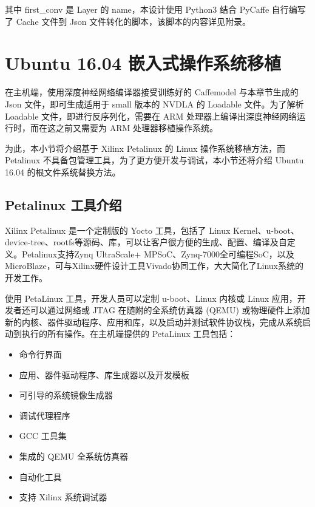 其中 first\_conv 是 Layer 的 name，本设计使用 Python3 结合 PyCaffe 自行编写了 Cache 文件到 Json 文件转化的脚本，该脚本的内容详见附录。

 
\section{Ubuntu 16.04 嵌入式操作系统移植}

在主机端，使用深度神经网络编译器接受训练好的 Caffemodel 与本章节生成的 Json 文件，即可生成适用于 small 版本的 NVDLA 的 Loadable 文件。为了解析 Loadable 文件，即进行反序列化，需要在 ARM 处理器上编译出深度神经网络运行时，而在这之前又需要为 ARM 处理器移植操作系统。

为此，本小节将介绍基于 Xilinx Petalinux 的 Linux 操作系统移植方法，而 Petalinux 不具备包管理工具，为了更方便开发与调试，本小节还将介绍 Ubuntu 16.04 的根文件系统替换方法。

\subsection{Petalinux 工具介绍}

Xilinx Petalinux 是一个定制版的 Yocto 工具，包括了 Linux Kernel、u-boot、device-tree、rootfs等源码、库，可以让客户很方便的生成、配置、编译及自定义。Petalinux支持Zynq UltraScale+ MPSoC、Zynq-7000全可编程SoC，以及MicroBlaze，可与Xilinx硬件设计工具Vivado协同工作，大大简化了Linux系统的开发工作。

使用 PetaLinux 工具，开发人员可以定制 u-boot、Linux 内核或 Linux 应用，开发者还可以通过网络或 JTAG 在随附的全系统仿真器 (QEMU) 或物理硬件上添加新的内核、器件驱动程序、应用和库，以及启动并测试软件协议栈，完成从系统启动到执行的所有操作。在主机端提供的 PetaLinux 工具包括：

\begin{itemize}
    \item 命令行界面
    \item 应用、器件驱动程序、库生成器以及开发模板
    \item 可引导的系统镜像生成器
    \item 调试代理程序
    \item GCC 工具集
    \item 集成的 QEMU 全系统仿真器
    \item 自动化工具
    \item 支持 Xilinx 系统调试器
\end{itemize}

